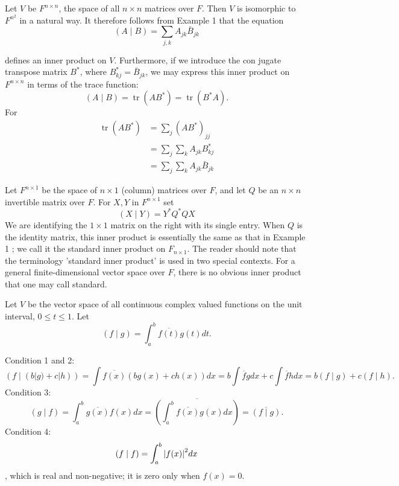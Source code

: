 \documentclass[main.tex]{subfiles}
\begin{document}
\begin{example}
    Let $V$ be $F^{n \times n}$, the space of all $n \times n$ matrices over $F$. Then $V$ is isomorphic to $F^{n^2}$ in a natural way. It therefore follows from Example 1 that the equation
$$
(A \mid B)=\sum_{j, k} A_{j k} \bar{B}_{j k}
$$



defines an inner product on $V$. Furthermore, if we introduce the con jugate transpose matrix $B^*$, where $B_{k j}^*=\bar{B}_{j k}$, we may express this inner product on $F^{n \times n}$ in terms of the trace function:
$$
(A \mid B)=\operatorname{tr}\left(A B^*\right)=\operatorname{tr}\left(B^* A\right) .
$$
For
$$
\begin{aligned}
\operatorname{tr}\left(A B^*\right) & =\sum_j\left(A B^*\right)_{j j} \\
& =\sum_j \sum_k A_{j k} B_{k j}^* \\
& =\sum_j \sum_k A_{j k} \bar{B}_{j k}
\end{aligned}
$$

\end{example}
\begin{example}
Let $F^{n \times 1}$ be the space of $n \times 1$ (column) matrices over $F$, and let $Q$ be an $n \times n$ invertible matrix over $F$. For $X, Y$ in $F^{n \times 1}$ set
$$
(X \mid Y)=Y^* Q^* Q X
$$
We are identifying the $1 \times 1$ matrix on the right with its single entry. When $Q$ is the identity matrix, this inner product is essentially the same as that in Example 1 ; we call it the standard inner product on $F_{n \times 1}$. The reader should note that the terminology 'standard inner product' is used in two special contexts. For a general finite-dimensional vector space over $F$, there is no obvious inner product that one may call standard.
\end{example}
\example Let $V$ be the vector space of all continuous complex valued functions on the unit interval, $0 \leq t \leq 1$. Let
$$
(f \mid g)=\int_a^b \overline{f(t)} g(t) d t .
$$


Condition 1 and 2:
$$
( f \mid(b|g)+c|h))=\int \overline{f(x)}(b g(x)+c h(x)) d x=b \int \overline{f} g d x+c \int \overline{f} h d x=b( f \mid g)+c( f \mid h) .
$$
Condition 3:
$$
( g \mid f)=\int_a^b \overline{g(x)} f(x) d x=\overline{\left(\int_a^b \overline{f(x)} g(x) d x\right)}=\overline{( f \mid g)} .
$$
Condition 4:
$$(f \mid f) = \int_a^b \abs{f(x)}^2 dx $$,
which is real and non-negative; it is zero only when $f(x) = 0$. 
\end{document}
